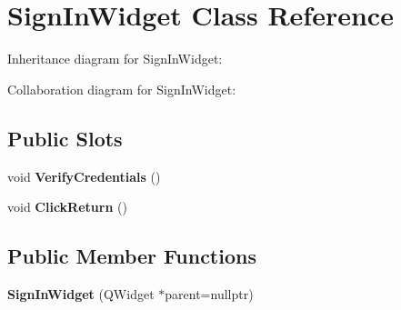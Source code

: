 \hypertarget{classSignInWidget}{}\section{Sign\+In\+Widget Class Reference}
\label{classSignInWidget}


Inheritance diagram for Sign\+In\+Widget\+:


Collaboration diagram for Sign\+In\+Widget\+:
\subsection*{Public Slots}
\begin{DoxyCompactItemize}
\item 
\mbox{\label{classSignInWidget_a49decc48a2de009aa97b5a3358a76da7}} 
void {\bfseries Verify\+Credentials} ()
\item 
\mbox{\label{classSignInWidget_a503bbf74ccb40642f4b05a48bb9dc99a}} 
void {\bfseries Click\+Return} ()
\end{DoxyCompactItemize}
\subsection*{Public Member Functions}
\begin{DoxyCompactItemize}
\item 
\mbox{\label{classSignInWidget_afd6abbeff046b789c1801981c8b7358d}} 
{\bfseries Sign\+In\+Widget} (Q\+Widget $\ast$parent=nullptr)
\end{DoxyCompactItemize}
